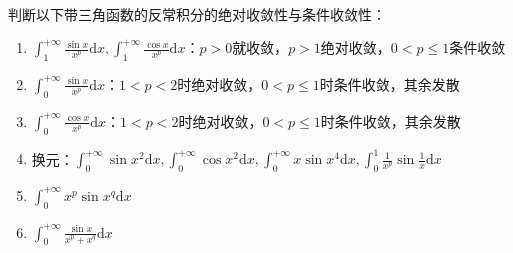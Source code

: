 ~

\begin{exercise}
  判断以下带三角函数的反常积分的绝对收敛性与条件收敛性：
  \begin{enumerate}
  \item $\int _1^{+\infty} \frac{\sin x}{x^p}\mathrm{d}x, \int_1^{+\infty}\frac{\cos x}{x^p}\mathrm{d}x$：$p>0$就收敛，$p >1$绝对收敛，$0 < p \leq  1$条件收敛
  \item $\int_0^{+\infty}\frac{\sin x}{x^p}\mathrm{d} x$：$1 < p < 2$时绝对收敛，$0 < p \leq 1$时条件收敛，其余发散
  \item $ \int_0^{+\infty}\frac{\cos x}{x^p}\mathrm{d} x$：$1 < p < 2$时绝对收敛，$0 < p \leq 1$时条件收敛，其余发散
  \item 换元：$\int _0^{+\infty} \sin x^2 \mathrm{d}x, \int_0^{+\infty}\cos x^2 \mathrm{d}x, \int_0^{+\infty}x \sin x^4 \mathrm{d}x, \int_0^1 \frac{1}{x^p} \sin \frac{1}{x} \mathrm{d} x$
  \item $\int_0^{+\infty} x^p \sin x^q \mathrm{d} x$
  \item $\int_0^{+\infty} \frac{\sin x}{x^p + x^q}\mathrm{d} x$
  \end{enumerate}
\end{exercise}

